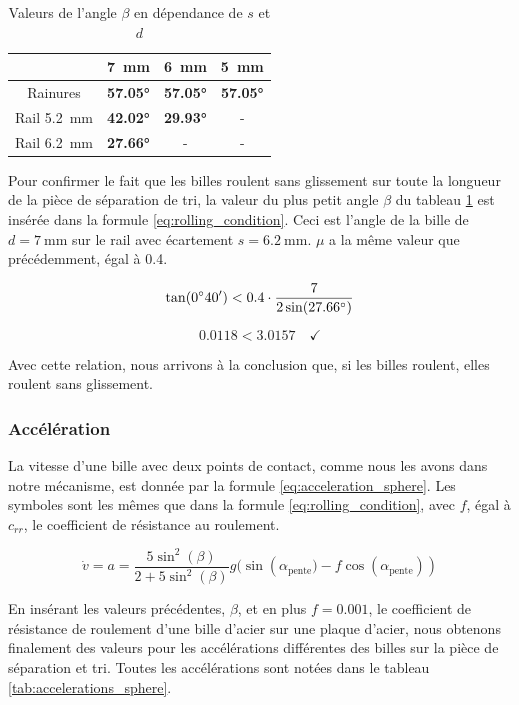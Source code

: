 \begin{table}[htbp]
    \centering
    \begin{tabular}{|c|c|c|c|}
        \hline
         & \SI{7}{\mm} & \SI{6}{\mm} & \SI{5}{\mm} \\
        \hline
        Rainures & \textbf{\ang{57.05}} & \textbf{\ang{57.05}} & \textbf{\ang{57.05}} \\
        \hline
        Rail \SI{5.2}{\mm}& \textbf{\ang{42.02}} & \textbf{\ang{29.93}} & - \\
        \hline
        Rail \SI{6.2}{\mm}& \textbf{\ang{27.66}} & - & - \\
        \hline
    \end{tabular}
    \caption{Valeurs de l'angle $\beta$ en dépendance de $s$ et $d$}
    \label{tab:beta_sphere}
\end{table}

Pour confirmer le fait que les billes roulent sans glissement sur toute la longueur de la pièce de séparation de tri, la valeur du plus petit angle $\beta$ du tableau \ref{tab:beta_sphere} est insérée dans la formule \ref{eq:rolling_condition}. Ceci est l'angle de la bille de $d = \SI{7}{\mm}$ sur le rail avec écartement $s = \SI{6.2}{\mm}$. $\mu$ a la même valeur que précédemment, égal à \num{0.4}.

\[\sisetup{add-arc-degree-zero} \tan(\ang{;40;}) < \num{0.4} \cdot \frac{7}{2\sin(\ang{27.66})}\]

\[\num{0.0118} < \num{3.0157} \quad \checkmark\]

Avec cette relation, nous arrivons à la conclusion que, si les billes roulent, elles roulent sans glissement.

\subsubsection{Accélération}
La vitesse d'une bille avec deux points de contact, comme nous les avons dans notre mécanisme, est donnée par la formule \ref{eq:acceleration_sphere}. Les symboles sont les mêmes que dans la formule \ref{eq:rolling_condition}, avec $f$, égal à $c_{rr}$, le coefficient de résistance au roulement.

\begin{equation}
    \dot{v} = a = \frac{5\sin^{2}(\beta)}{2+5\sin^{2}(\beta)} g(\sin({\alpha_{\text{pente}}) - f\cos(\alpha_{\text{pente}})})
    \label{eq:acceleration_sphere}
\end{equation}

En insérant les valeurs précédentes, $\beta$, et en plus $f = \num{0.001}$, le coefficient de résistance de roulement d'une bille d'acier sur une plaque d'acier, nous obtenons finalement des valeurs pour les accélérations différentes des billes sur la pièce de séparation et tri. Toutes les accélérations sont notées dans le tableau \ref{tab:accelerations_sphere}.

